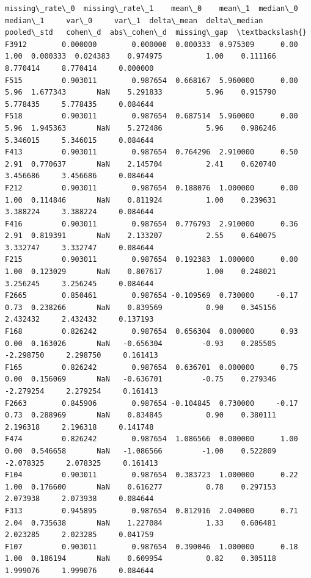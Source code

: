 \documentclass[11pt]{article}
\begin{document}
    
    \begin{Verbatim}[commandchars=\\\{\}]
       missing\_rate\_0  missing\_rate\_1    mean\_0    mean\_1  median\_0  median\_1     var\_0     var\_1  delta\_mean  delta\_median  pooled\_std   cohen\_d  abs\_cohen\_d  missing\_gap  \textbackslash{}
F3912        0.000000        0.000000  0.000333  0.975309      0.00      1.00  0.000333  0.024383    0.974975          1.00    0.111166  8.770414     8.770414     0.000000   
F515         0.903011        0.987654  0.668167  5.960000      0.00      5.96  1.677343       NaN    5.291833          5.96    0.915790  5.778435     5.778435     0.084644   
F518         0.903011        0.987654  0.687514  5.960000      0.00      5.96  1.945363       NaN    5.272486          5.96    0.986246  5.346015     5.346015     0.084644   
F413         0.903011        0.987654  0.764296  2.910000      0.50      2.91  0.770637       NaN    2.145704          2.41    0.620740  3.456686     3.456686     0.084644   
F212         0.903011        0.987654  0.188076  1.000000      0.00      1.00  0.114846       NaN    0.811924          1.00    0.239631  3.388224     3.388224     0.084644   
F416         0.903011        0.987654  0.776793  2.910000      0.36      2.91  0.819391       NaN    2.133207          2.55    0.640075  3.332747     3.332747     0.084644   
F215         0.903011        0.987654  0.192383  1.000000      0.00      1.00  0.123029       NaN    0.807617          1.00    0.248021  3.256245     3.256245     0.084644   
F2665        0.850461        0.987654 -0.109569  0.730000     -0.17      0.73  0.238266       NaN    0.839569          0.90    0.345156  2.432432     2.432432     0.137193   
F168         0.826242        0.987654  0.656304  0.000000      0.93      0.00  0.163026       NaN   -0.656304         -0.93    0.285505 -2.298750     2.298750     0.161413   
F165         0.826242        0.987654  0.636701  0.000000      0.75      0.00  0.156069       NaN   -0.636701         -0.75    0.279346 -2.279254     2.279254     0.161413   
F2663        0.845906        0.987654 -0.104845  0.730000     -0.17      0.73  0.288969       NaN    0.834845          0.90    0.380111  2.196318     2.196318     0.141748   
F474         0.826242        0.987654  1.086566  0.000000      1.00      0.00  0.546658       NaN   -1.086566         -1.00    0.522809 -2.078325     2.078325     0.161413   
F104         0.903011        0.987654  0.383723  1.000000      0.22      1.00  0.176600       NaN    0.616277          0.78    0.297153  2.073938     2.073938     0.084644   
F313         0.945895        0.987654  0.812916  2.040000      0.71      2.04  0.735638       NaN    1.227084          1.33    0.606481  2.023285     2.023285     0.041759   
F107         0.903011        0.987654  0.390046  1.000000      0.18      1.00  0.186194       NaN    0.609954          0.82    0.305118  1.999076     1.999076     0.084644   


\end{Verbatim}
\end{document}
